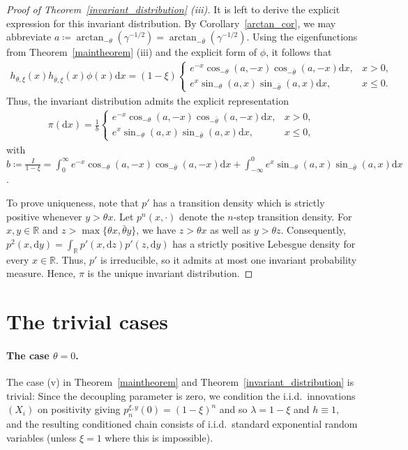 \documentclass[12pt]{article}
\newcommand{\R}{\mathbb{R}} %
\newcommand{\1}{\mathds{1}}
\renewcommand{\d}{\mathrm{d}}
\theoremstyle{definition}
\theoremstyle{plain}
\theoremstyle{remark}
\begin{document}
\begin{proof}[Proof of Theorem~\ref{invariant_distribution} (iii)]
It is left to derive the explicit expression for this invariant distribution. By Corollary~\ref{arctan_cor}, we may abbreviate $a\coloneqq \arctan_{ -\theta}(\gamma^{-1/2})=\arctan_{-\bar\theta}(\gamma^{-1/2})$. Using the eigenfunctions from Theorem~\ref{maintheorem} (iii) and the explicit form of $\phi$,
it follows that 
\begin{align*}
    h_{\theta,\xi}(x) h_{\bar\theta,\xi}(x) \phi(x)\d x = (1-\xi) \begin{cases} e^{-x} \cos_{-\theta}(a,-x) \cos_{-\bar \theta}(a,-x)\d x, &x>0,\\ e^x \sin_{-\theta}(a,x) \sin_{-\bar \theta}(a,x)\d x, &x\leq0. \end{cases}
\end{align*}
Thus, the invariant distribution admits the explicit representation 
\begin{align*}
    \pi(\d x) = \frac{1}{b} 
    \begin{cases} e^{-x} \cos_{-\theta}(a,-x) \cos_{-\bar \theta}(a,-x)\d x, &x>0,\\ e^x \sin_{-\theta}(a,x) \sin_{-\bar \theta}(a,x)\d x, &x\leq0, \end{cases}
\end{align*}
with $b\coloneqq\frac{I}{1-\xi}= \int_0^\infty e^{-x} \cos_{-\theta}(a,-x) \cos_{-\bar \theta}(a,-x)\d x + \int_{-\infty}^0 e^x \sin_{-\theta}(a,x) \sin_{-\bar \theta}(a,x)\d x$.

To prove uniqueness, note that $p'$ has a transition density which is strictly positive whenever $y>\theta x$. Let $p^n(x,\cdot)$ denote the $n$-step transition density. For $x,y\in\R$ and $z>\max\{\theta x,\bar\theta y\}$, we have $z>\theta x$ as well as $y>\theta z$. Consequently, $p^2(x,\d y)=\int_{\R}p'(x,\d z)p'(z,\d y)$ has a strictly positive Lebesgue density for every $x\in\R$. Thus, $p'$ is irreducible, so it admits at most one invariant probability measure. Hence, $\pi$ is the unique invariant distribution.
\end{proof}

\section{The trivial cases}\label{trivialcases}
\paragraph{The case \texorpdfstring{$\theta=0$}{theta =0}.}
The case (v) in Theorem~\ref{maintheorem} and Theorem~\ref{invariant_distribution} is trivial: Since the decoupling parameter is zero, we condition the i.i.d.\ innovations $(X_i)$ on positivity giving $p_n^{\xi,y}(0)=(1-\xi)^n$ and so $\lambda=1-\xi$ and $h\equiv 1$, and the resulting conditioned chain consists of i.i.d.\ standard exponential random variables (unless $\xi=1$ where this is impossible).
\end{document}
